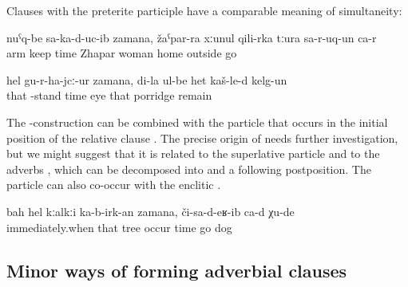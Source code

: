 Clauses with the preterite participle have a comparable meaning of simultaneity:
%
\begin{exe}
	\ex	\label{ex:‎While he presented the condolences (lit. kept his hands in front), Zhapar's wife entered}
	\gll	nuˁq-be	sa-ka-d-uc-ib		zamana,	žaˁpar-ra	xːunul	qili-rka	tːura	sa-r-uq-un	ca-r\\
		arm	keep	time	Zhapar	woman	home	outside 	go	\\
	\glt	{}

	\ex	\label{ex:‎While I got up, my eyes remained on the porridge}
	\gll	hel	gu-r-ha-jcː-ur	zamana,	di-la	ul-be	het	kaš-le-d	kelg-un\\
		that	-stand	time		eye	that	porridge	remain\\
	\glt	{}
\end{exe}

The -construction can be combined with the particle   that occurs in the initial position of the relative clause . The precise origin of  needs further investigation, but we might suggest that it is related to the superlative particle   and to the adverbs  , which can be decomposed into  and a following postposition. The particle can also co-occur with the enclitic .
%
\begin{exe}
	\ex	\label{ex:‎When this tree already felt down, the dogs were coming}
	\gll	bah	hel	kːalkːi	ka-b-irk-an	zamana,	či-sa-d-eʁ-ib	ca-d	χu-de\\
		immediately.when	that	tree	occur	time	go		dog\\
	\glt	{}
\end{exe}



\subsection{Minor ways of forming adverbial clauses}
\label{sec:minor ways of forming adverbial clauses}

